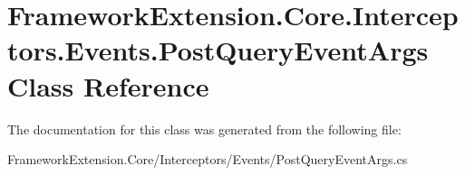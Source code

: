 \hypertarget{class_framework_extension_1_1_core_1_1_interceptors_1_1_events_1_1_post_query_event_args}{\section{Framework\-Extension.\-Core.\-Interceptors.\-Events.\-Post\-Query\-Event\-Args Class Reference}
\label{class_framework_extension_1_1_core_1_1_interceptors_1_1_events_1_1_post_query_event_args}
}


The documentation for this class was generated from the following file\-:\begin{DoxyCompactItemize}
\item 
Framework\-Extension.\-Core/\-Interceptors/\-Events/Post\-Query\-Event\-Args.\-cs\end{DoxyCompactItemize}
